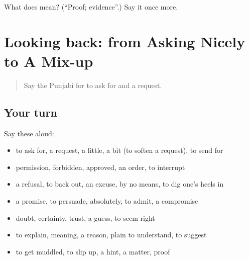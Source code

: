 \begin{tcolorbox}[breakable,colback=teal!4,colframe=teal!35!black,title={Before you move on}]
What does  mean? (\textquotedblleft{}Proof; evidence\textquotedblright{}.) Say it once more.
\end{tcolorbox}
\section[(dialogue)]{Looking back: from Asking Nicely to A Mix-up}

\label{lesson:PA-R343-review-337-343}



\begin{quote}
Say the Punjabi for to ask for and a request.
\end{quote}

\subsection*{Your turn}
Say these aloud:

\begin{itemize}
\raggedright
  \item to ask for, a request, a little, a bit (to soften a request), to send for
  \item permission, forbidden, approved, an order, to interrupt
  \item a refusal, to back out, an excuse, by no means, to dig one's heels in
  \item a promise, to persuade, absolutely, to admit, a compromise
  \item doubt, certainty, trust, a guess, to seem right
  \item to explain, meaning, a reason, plain to understand, to suggest
  \item to get muddled, to slip up, a hint, a matter, proof
\end{itemize}

